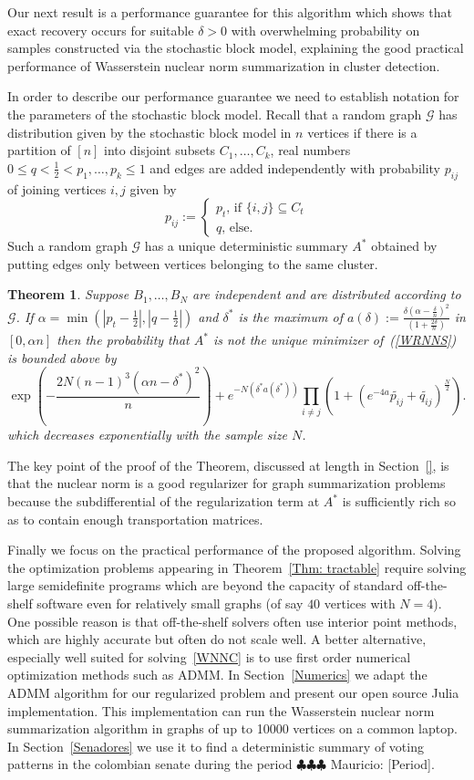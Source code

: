 \documentclass[12pt]{amsart}
\newtheorem{theorem}[lemma]{Theorem}
\theoremstyle{remark}
\newcommand{\grG}{{\mathcal{G}}}
\newcommand{\mv}[1]{{\color{red} \sf $\clubsuit\clubsuit\clubsuit$ Mauricio: [#1]}}
\begin{document}
Our next result is a performance guarantee for this algorithm which shows that exact recovery occurs for suitable $\delta>0$ with overwhelming probability on samples constructed via the stochastic block model, explaining the good practical performance of Wasserstein nuclear norm summarization in cluster detection.

In order to describe our performance guarantee we need to establish notation for the parameters of the stochastic block model. Recall that a random graph $\grG$ has distribution given by the stochastic block model in $n$ vertices if there is a partition of $[n]$ into disjoint subsets $C_1,\dots, C_k$, real numbers $0\leq q<\frac{1}{2}<p_1,\dots, p_k\leq 1$ and edges are added independently with probability $p_{ij}$ of joining vertices $i,j$ given by
\[p_{ij}:=\begin{cases}
p_t\text{, if $\{i,j\}\subseteq C_t$}\\
q\text{, else.}
\end{cases}
\] 
Such a random graph $\grG$ has a unique deterministic summary $A^*$ obtained by putting edges only between vertices belonging to the same cluster.

\begin{theorem} Suppose $B_1,\dots, B_N$ are independent and are distributed according to $\grG$. If $\alpha = \min (|p_t-\frac{1}{2}|, |q-\frac{1}{2}|)$ and $\delta^*$ is the maximum of $a(\delta):=\frac{\delta\left(\alpha-\frac{\delta}{n}\right)^2}{\left(1+\frac{2\delta}{n}\right)}$ in $[0,\alpha n]$ then the probability that $A^*$ is not the unique minimizer of~(\ref{WRNNS}) is bounded above by
\[ \exp\left(-\frac{2N(n-1)^3(\alpha n-\delta^*)^2}{n}\right) + e^{-N\left(\delta^* a(\delta^*)\right)}\prod_{i\neq j}\left(1+ (e^{-4a}\widetilde{p_{ij}}+\widetilde{q_{ij}})^{\frac{N}{2}}\right).\] 
which decreases exponentially with the sample size $N$.
\end{theorem}

The key point of the proof of the Theorem, discussed at length in Section~\ref{}, is that the nuclear norm is a good regularizer for graph summarization problems because the subdifferential of the regularization term at $A^*$ is sufficiently rich so as to contain enough transportation matrices. 

Finally we focus on the practical performance of the proposed algorithm. Solving the optimization problems appearing in Theorem~\ref{Thm: tractable} require solving large semidefinite programs which are beyond the  capacity of standard off-the-shelf software even for relatively small graphs (of say $40$ vertices with $N=4$). One possible reason is that off-the-shelf solvers often use interior point methods, which are highly accurate but often do not scale well. A better alternative, especially well suited for solving~\ref{WNNC} is to use first order numerical optimization methods such as ADMM. In Section~\ref{Numerics} we adapt the ADMM algorithm for our regularized problem and present our open source Julia implementation. This implementation can run the Wasserstein nuclear norm summarization algorithm in graphs of up to 10000 vertices on a common laptop. In Section~\ref{Senadores} we use it to find a deterministic summary of voting patterns in the colombian senate during the period \mv{Period}. 
\end{document}
